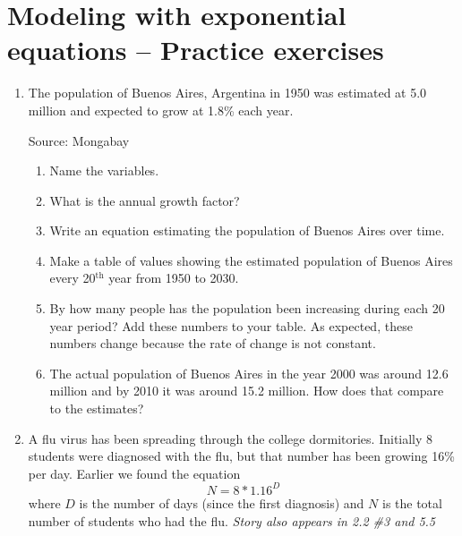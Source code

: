 \section{Modeling with exponential equations -- Practice exercises}

\begin{enumerate}
\item The population of Buenos Aires, Argentina in 1950 was estimated at 5.0 million and expected to grow at 1.8\% each year.  \hfill \begin{footnotesize} Source: Mongabay \end{footnotesize}
\begin{enumerate}
\item Name the variables. \vfill
\item What is the annual growth factor? \vfill
\item Write an equation estimating the population of Buenos Aires over time. \vfill
\item Make a table of values showing the estimated population of Buenos Aires every 20$^{\text{th}}$ year from 1950 to 2030. \vfill \vfill \vfill
\item By how many people has the population been increasing during each 20 year period? Add these numbers to your table. As expected, these numbers change because the rate of change is not constant.
\item The actual population of Buenos Aires in the year 2000 was around 12.6 million and by 2010 it was around 15.2 million.  How does that compare to the estimates? \vfill
\end{enumerate} 

\newpage %

\item A flu virus has been spreading through the college dormitories. Initially 8 students were diagnosed with the flu, but that number has been growing 16\% per day.   Earlier we found the equation $$N=8 \ast1.16^D$$ where $D$ is the number of days (since the first diagnosis) and $N$ is the total number of students who had the flu.   \hfill  \emph{Story also appears in 2.2 \#3 and 5.5}


\end{enumerate}
